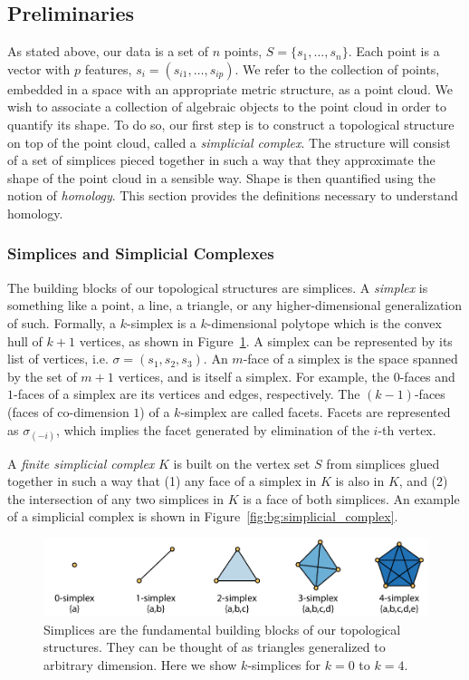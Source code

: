 \subsection{Preliminaries}
\label{bg:tda:math}

As stated above, our data is a set of $n$ points, $S=\{s_1,\ldots,s_n\}$.
Each point is a vector with $p$ features, $s_i=(s_{i1},\ldots,s_{ip})$.
We refer to the collection of points, embedded in a space with an appropriate metric structure, as a point cloud.
We wish to associate a collection of algebraic objects to the point cloud in order to quantify its shape.
To do so, our first step is to construct a topological structure on top of the point cloud, called a \emph{simplicial complex}.
The structure will consist of a set of simplices pieced together in such a way that they approximate the shape of the point cloud in a sensible way.
Shape is then quantified using the notion of \emph{homology}.
This section provides the definitions necessary to understand homology.

\subsubsection{Simplices and Simplicial Complexes}
\label{bg:tda:math:simplices}

The building blocks of our topological structures are simplices.
A \emph{simplex} is something like a point, a line, a triangle, or any higher-dimensional generalization of such.
Formally, a $k$-simplex is a $k$-dimensional polytope which is the convex hull of $k+1$ vertices, as shown in Figure~\ref{fig:bg:simplices}.
A simplex can be represented by its list of vertices, i.e. $\sigma=(s_{1},s_{2},s_{3})$.
An $m$-face of a simplex is the space spanned by the set of $m+1$ vertices, and is itself a simplex.
For example, the $0$-faces and $1$-faces of a simplex are its vertices and edges, respectively.
The $(k-1)$-faces (faces of co-dimension $1$) of a $k$-simplex are called facets.
Facets are represented as $\sigma_{(-i)}$, which implies the facet generated by elimination of the $i$-th vertex.

A \emph{finite simplicial complex} $K$ is built on the vertex set $S$ from simplices glued together in such a way that (1) any face of a simplex in $K$ is also in $K$, and (2) the intersection of any two simplices in $K$ is a face of both simplices.
An example of a simplicial complex is shown in Figure~\ref{fig:bg:simplicial_complex}.

\begin{figure}
\centering
\includegraphics[]{./fig/background/simplices.pdf}
\caption[Simplices: The building blocks of topological complexes]{Simplices are the fundamental building blocks of our topological structures. They can be thought of as triangles generalized to arbitrary dimension. Here we show $k$-simplices for $k=0$ to $k=4$.}
\label{fig:bg:simplices}
\end{figure}

